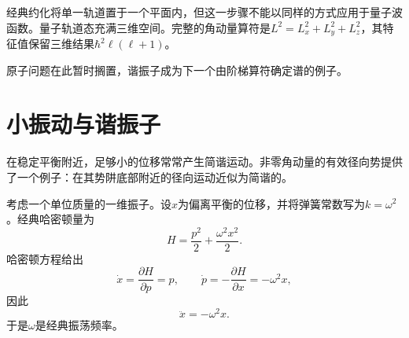 \begin{classroomqa}
\end{classroomqa}


经典约化将单一轨道置于一个平面内，但这一步骤不能以同样的方式应用于量子波函数。量子轨道态充满三维空间。完整的角动量算符是\(L^2=L_x^2+L_y^2+L_z^2\)，其特征值保留三维结果\(\hbar^2\ell(\ell+1)\)。

\begin{classroomqa}
\end{classroomqa}

\begin{classroomqa}
\end{classroomqa}

原子问题在此暂时搁置，谐振子成为下一个由阶梯算符确定谱的例子。

\section{小振动与谐振子}

在稳定平衡附近，足够小的位移常常产生简谐运动。非零角动量的有效径向势提供了一个例子：在其势阱底部附近的径向运动近似为简谐的。

考虑一个单位质量的一维振子。设\(x\)为偏离平衡的位移，并将弹簧常数写为\(k=\omega^2\)。经典哈密顿量为
\begin{equation}
H=\frac{p^2}{2}+\frac{\omega^2x^2}{2}.
\end{equation}
哈密顿方程给出
\begin{equation}
\dot{x}=\frac{\partial H}{\partial p}=p,
\qquad
\dot{p}=-\frac{\partial H}{\partial x}=-\omega^2x,
\end{equation}
因此
\begin{equation}
\ddot{x}=-\omega^2x.
\end{equation}
于是\(\omega\)是经典振荡频率。

